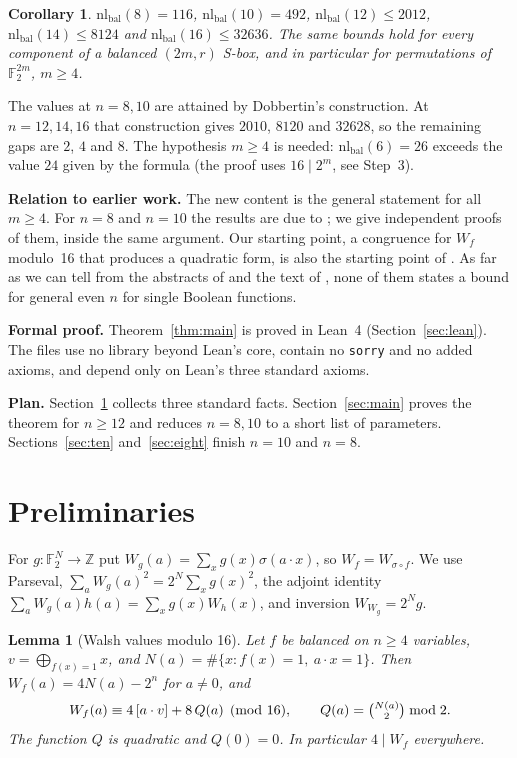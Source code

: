 \documentclass[11pt]{amsart}
\newtheorem{lemma}[theorem]{Lemma}
\newtheorem{corollary}[theorem]{Corollary}
\theoremstyle{remark}
\newcommand{\F}{\mathbb{F}_2}
\newcommand{\W}{W}
\newcommand{\nl}{\mathrm{nl}}
\newcommand{\sg}{\sigma}
\begin{document}
\begin{corollary}\label{cor}
$\nl_{\mathrm{bal}}(8)=116$, $\nl_{\mathrm{bal}}(10)=492$, $\nl_{\mathrm{bal}}(12)\le 2012$,
$\nl_{\mathrm{bal}}(14)\le 8124$ and $\nl_{\mathrm{bal}}(16)\le 32636$. The same bounds hold for
every component of a balanced $(2m,r)$ S-box, and in particular for permutations of
$\F^{2m}$, $m\ge4$.
\end{corollary}

The values at $n=8,10$ are attained by Dobbertin's construction. At $n=12,14,16$ that
construction gives $2010$, $8120$ and $32628$, so the remaining gaps are $2$, $4$ and $8$.
The hypothesis $m\ge 4$ is needed: $\nl_{\mathrm{bal}}(6)=26$ exceeds the value $24$ given by the formula
(the proof uses $16\mid 2^m$, see Step~3).

\medskip\noindent\textbf{Relation to earlier work.}
The new content is the general statement for all $m\ge 4$. For $n=8$ and $n=10$ the
results are due to \cite{YHZZW26,LXW26,XW26}; we give independent proofs of them, inside
the same argument. Our starting point, a congruence for $\W_f$ modulo~16 that produces a
quadratic form, is also the starting point of \cite{LXW26}. As far as we can tell from the
abstracts of \cite{XW26,YHZZW26} and the text of \cite{LXW26}, none of them states a bound
for general even $n$ for single Boolean functions.

\medskip\noindent\textbf{Formal proof.}
Theorem~\ref{thm:main} is proved in Lean~4 (Section~\ref{sec:lean}). The files use no
library beyond Lean's core, contain no \texttt{sorry} and no added axioms, and depend
only on Lean's three standard axioms.

\medskip\noindent\textbf{Plan.} Section~\ref{sec:prelim} collects three standard facts.
Section~\ref{sec:main} proves the theorem for $n\ge 12$ and reduces $n=8,10$ to a short list
of parameters. Sections~\ref{sec:ten} and~\ref{sec:eight} finish $n=10$ and $n=8$.

\section{Preliminaries}\label{sec:prelim}

For $g:\F^N\to\mathbb{Z}$ put $\W_g(a)=\sum_x g(x)\sg(a\cdot x)$, so
$\W_f=\W_{\sg\circ f}$. We use Parseval, $\sum_a \W_g(a)^2=2^N\sum_x g(x)^2$, the
adjoint identity $\sum_a \W_g(a)h(a)=\sum_x g(x)\W_h(x)$, and inversion
$\W_{\W_g}=2^N g$.

\begin{lemma}[Walsh values modulo 16]\label{lem:mod16}
Let $f$ be balanced on $n\ge 4$ variables, $v=\bigoplus_{f(x)=1}x$, and
$N(a)=\#\{x: f(x)=1,\ a\cdot x=1\}$. Then $\W_f(a)=4N(a)-2^n$ for $a\neq 0$, and
\[
  \W_f(a)\equiv 4\,[a\cdot v]+8\,Q(a)\pmod{16},\qquad Q(a)=\tbinom{N(a)}{2}\bmod 2 .
\]
The function $Q$ is quadratic and $Q(0)=0$. In particular $4\mid \W_f$ everywhere.
\end{lemma}
\end{document}
